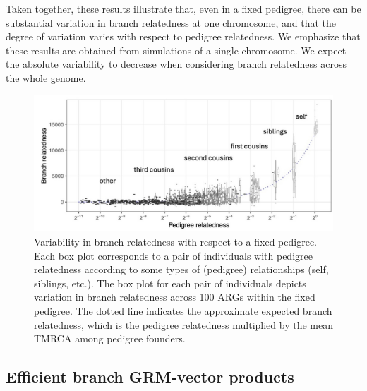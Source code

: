 Taken together, these results illustrate that, even in a fixed pedigree,
there can be substantial variation in branch relatedness at one chromosome,
and that the degree of variation varies with respect to pedigree relatedness.
%
We emphasize that these results are obtained from simulations of a single chromosome.
%
We expect the absolute variability to decrease when considering
branch relatedness across the whole genome.

\begin{figure}
    \centering
    \includegraphics[width=\textwidth]{Figures/Fig5_branch_recap_sim_boxplot_combined_behind2.jpg}
    \caption{Variability in branch relatedness with respect to a fixed pedigree.
    Each box plot corresponds to a pair of individuals with pedigree relatedness
    according to some types of (pedigree) relationships (self, siblings, etc.).
    The box plot for each pair of individuals depicts variation in branch relatedness across 100 ARGs within the fixed pedigree.
    The dotted line indicates the approximate expected branch relatedness,
    which is the pedigree relatedness multiplied by the mean TMRCA among pedigree founders.}
    \label{fig:boxplots}
\end{figure}



% 


\subsection{Efficient branch GRM-vector products}


